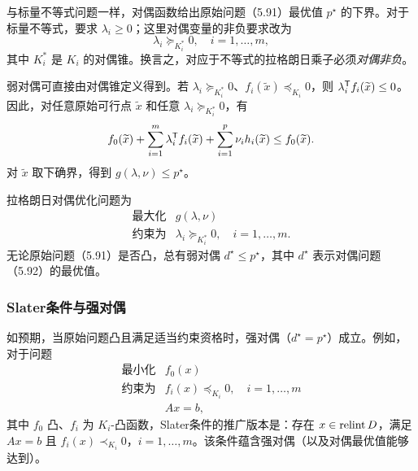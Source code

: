 与标量不等式问题一样，对偶函数给出原始问题（5.91）最优值 $p^\star$ 的下界。对于标量不等式，要求 $\lambda_i\ge0$；这里对偶变量的非负要求改为
\[
\lambda_i\succeq_{K_i^*}0,\quad i=1,\ldots,m,
\]
其中 $K_i^*$ 是 $K_i$ 的对偶锥。换言之，对应于不等式的拉格朗日乘子必须\emph{对偶非负}。

弱对偶可直接由对偶锥定义得到。若 $\lambda_i\succeq_{K_i^*}0$、$f_i(\widetilde x)\preceq_{K_i}0$，则 $\lambda_i^\mathsf T f_i(\widetilde x)\le0$。因此，对任意原始可行点 $\widetilde x$ 和任意 $\lambda_i\succeq_{K_i^*}0$，有
\[
f_0(\widetilde x)+\sum_{i=1}^m\lambda_i^\mathsf T f_i(\widetilde x)
+\sum_{i=1}^p\nu_i h_i(\widetilde x)\le f_0(\widetilde x).
\]
对 $\widetilde x$ 取下确界，得到 $g(\lambda,\nu)\le p^\star$。

拉格朗日对偶优化问题为
\begin{equation}
\begin{array}{ll}\text{最大化}&g(\lambda,\nu)\\
\text{约束为}&\lambda_i\succeq_{K_i^*}0,\quad i=1,\ldots,m.\end{array}\tag{5.92}
\end{equation}
无论原始问题（5.91）是否凸，总有弱对偶 $d^\star\le p^\star$，其中 $d^\star$ 表示对偶问题（5.92）的最优值。

\subsubsection*{Slater条件与强对偶}
如预期，当原始问题凸且满足适当约束资格时，强对偶（$d^\star=p^\star$）成立。例如，对于问题
\[
\begin{array}{ll}\text{最小化}&f_0(x)\\
\text{约束为}&f_i(x)\preceq_{K_i}0,\quad i=1,\ldots,m\\
&Ax=b,\end{array}
\]
其中 $f_0$ 凸、$f_i$ 为 $K_i$-凸函数，Slater条件的推广版本是：存在 $x\in\operatorname{relint} D$，满足 $Ax=b$ 且 $f_i(x)\prec_{K_i}0$，$i=1,\ldots,m$。该条件蕴含强对偶（以及对偶最优值能够达到）。


